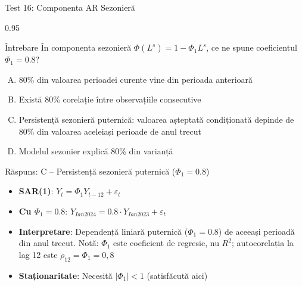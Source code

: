 \documentclass[9pt, aspectratio=169, t]{beamer}
\begin{document}
\begin{frame}{Test 16: Componenta AR Sezonieră}
    \begin{cminipage}{0.95\textwidth}
    \begin{alertblock}{Întrebare}
        În componenta sezonieră $\Phi(L^s) = 1 - \Phi_1 L^s$, ce ne spune coeficientul $\Phi_1 = 0.8$?
    \end{alertblock}

    \vspace{0.1cm}

    {\footnotesize
    \begin{enumerate}[A)]\setlength{\itemsep}{0pt}
        \item 80\% din valoarea perioadei curente vine din perioada anterioară
        \item Există 80\% corelație între observațiile consecutive
        \item Persistență sezonieră puternică: valoarea așteptată condiționată depinde de 80\% din valoarea aceleiași perioade de anul trecut
        \item Modelul sezonier explică 80\% din varianță
    \end{enumerate}
    }
    \vspace{-1mm}
    \pause
    \begin{exampleblock}{Răspuns: C -- Persistență sezonieră puternică ($\Phi_1 = 0.8$)}
        {\scriptsize
        \begin{itemize}\setlength{\itemsep}{0pt}
        \item \textbf{SAR(1)}: $Y_t = \Phi_1 Y_{t-12} + \varepsilon_t$
        \item \textbf{Cu $\Phi_1 = 0.8$}: $Y_{Ian2024} = 0.8 \cdot Y_{Ian2023} + \varepsilon_t$
        \item \textbf{Interpretare}: Dependență liniară puternică ($\Phi_1 = 0.8$) de aceeași perioadă din anul trecut. Notă: $\Phi_1$ este coeficient de regresie, nu $R^2$; autocorelația la lag 12 este $\rho_{12} = \Phi_1 = 0{,}8$
        \item \textbf{Staționaritate}: Necesită $|\Phi_1| < 1$ (satisfăcută aici)
        \end{itemize}
        }
    \end{exampleblock}
    \end{cminipage}
\end{frame}
\end{document}

